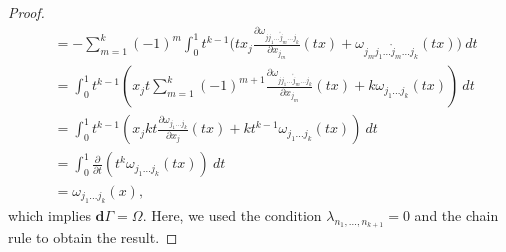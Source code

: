 \begin{proof}
\begin{equation*}
\begin{aligned}
	& = -\sum_{m=1}^k (-1)^m \int_0^1 t^{k-1} \big( tx_j\frac{\partial \omega_{jj_1\dots\mathring j_m\dots j_k} }{\partial x_{j_m}}(tx) + \omega_{j_mj_1\dots\mathring j_m\dots j_k}(tx)  \big)\ dt \\
       & = \int_0^1 t^{k-1} \left( x_j t \sum_{m=1}^{k} (-1)^{m+1}\frac{\partial \omega_{jj_1\dots\mathring j_m\dots j_k}}{\partial x_{j_m}}(tx) + k \omega_{j_1\dots j_k}(tx)  \right) \ dt \\
       & = \int_0^1 t^{k-1} \left( x_j k t \frac{\partial \omega_{j_1\dots j_k}}{\partial x_j}(tx) + kt^{k-1} \omega_{j_1\dots j_k}(tx)\right)\ dt \\
       & = \int_0^1 \frac{\partial}{\partial t}(t^k \omega_{j_1\dots j_k}(tx) )\ dt \\
      	& = \omega_{j_1\dots j_k}(x),
\end{aligned}
\end{equation*}
which implies $\mathbf d \Gamma = \Omega$. Here, we used the condition $\lambda_{n_1,\dots,n_{k+1}} = 0$ and the chain rule to obtain the result.
\end{proof}


